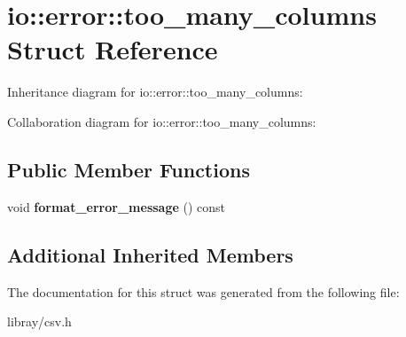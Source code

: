 \hypertarget{structio_1_1error_1_1too__many__columns}{}\section{io\+:\+:error\+:\+:too\+\_\+many\+\_\+columns Struct Reference}
\label{structio_1_1error_1_1too__many__columns}


Inheritance diagram for io\+:\+:error\+:\+:too\+\_\+many\+\_\+columns\+:


Collaboration diagram for io\+:\+:error\+:\+:too\+\_\+many\+\_\+columns\+:
\subsection*{Public Member Functions}
\begin{DoxyCompactItemize}
\item 
\mbox{\label{structio_1_1error_1_1too__many__columns_a2072af07b0408387579becc076a9809e}} 
void {\bfseries format\+\_\+error\+\_\+message} () const
\end{DoxyCompactItemize}
\subsection*{Additional Inherited Members}


The documentation for this struct was generated from the following file\+:\begin{DoxyCompactItemize}
\item 
libray/csv.\+h\end{DoxyCompactItemize}
